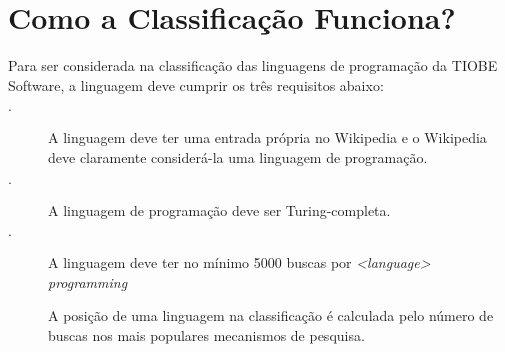 \documentclass[
    12pt,               %
    openright,          %
    twoside,            %
    a4paper,            %
    brazil              %
    ]{abntex2}
\begin{document}
\section{Como a Classificação Funciona?}

Para ser considerada na classificação das linguagens de programação da TIOBE
Software, a linguagem deve cumprir os três requisitos abaixo:

\begin{description}
\item[$\cdot$]A linguagem deve ter uma entrada própria no Wikipedia e o
Wikipedia deve claramente considerá-la uma linguagem de programação.
\item[$\cdot$]A linguagem de programação deve ser Turing-completa.
\item[$\cdot$]A linguagem deve ter no mínimo 5000 buscas por \textit{<language>
programming}

A posição de uma linguagem na classificação é calculada pelo número de buscas
nos mais populares mecanismos de pesquisa.\cite{Rank}

\end{description}

\end{document}
